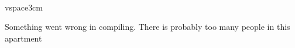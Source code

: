 \\vspace{3cm}

Something went wrong in compiling. There is probably too many people in this apartment
